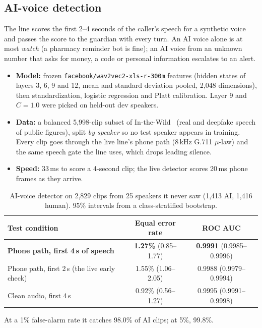 \documentclass[11pt]{article}
\begin{document}
\subsection{AI-voice detection}
The line scores the first 2--4 seconds of the caller's speech for a synthetic voice and passes the score to the guardian with every turn. An AI voice alone is at most \emph{watch} (a pharmacy reminder bot is fine); an AI voice from an unknown number that asks for money, a code or personal information escalates to an alert.
\begin{itemize}
\item \textbf{Model:} frozen \texttt{facebook/wav2vec2-xls-r-300m} features (hidden states of layers 3, 6, 9 and 12, mean and standard deviation pooled, 2,048 dimensions), then standardization, logistic regression and Platt calibration. Layer 9 and $C=1.0$ were picked on held-out dev speakers.
\item \textbf{Data:} a balanced 5,998-clip subset of In-the-Wild~\cite{itw} (real and deepfake speech of public figures), split \emph{by speaker} so no test speaker appears in training. Every clip goes through the live line's phone path (8\,kHz G.711 $\mu$-law) and the same speech gate the line uses, which drops leading silence.
\item \textbf{Speed:} 33\,ms to score a 4-second clip; the live detector scores 20\,ms phone frames as they arrive.
\end{itemize}
\begin{table}[H]\centering\small
\caption{AI-voice detector on 2,829 clips from 25 speakers it never saw (1,413 AI, 1,416 human). 95\% intervals from a class-stratified bootstrap.}\label{tab:voice}
\begin{tabular}{lcc}\toprule
Test condition & Equal error rate & ROC AUC \\ \midrule
\textbf{Phone path, first 4\,s of speech} & \textbf{1.27\%} \scriptsize(0.85--1.77) & \textbf{0.9991} \scriptsize(0.9985--0.9996) \\
Phone path, first 2\,s (the live early check) & 1.55\% \scriptsize(1.06--2.05) & 0.9988 \scriptsize(0.9979--0.9994) \\
Clean audio, first 4\,s & 0.92\% \scriptsize(0.56--1.27) & 0.9995 \scriptsize(0.9991--0.9998) \\
\bottomrule\end{tabular}
\par\smallskip\footnotesize At a 1\% false-alarm rate it catches 98.0\% of AI clips; at 5\%, 99.8\%.
\end{table}
\end{document}
